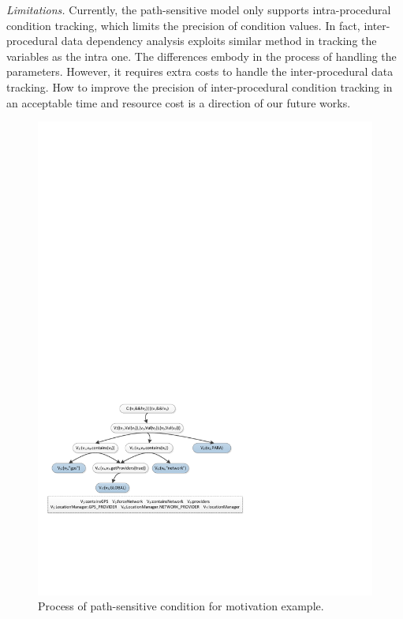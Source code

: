 \textit{Limitations.}
Currently, the path-sensitive model only supports intra-procedural condition tracking, which limits the precision of condition values. In fact, inter-procedural data dependency analysis exploits similar method in tracking the variables as the intra one. The differences embody in the process of handling the parameters. However, it requires extra costs to handle the inter-procedural data tracking. How to improve the precision of inter-procedural condition tracking in an acceptable time and resource cost is a direction of our future works.


\begin{figure}[!t]  
  \centering  
  \includegraphics[width=1\linewidth]{pic/motivationCondition.pdf}  
  \caption{Process of path-sensitive condition for motivation example.}  
  \label{fig:motConds}  
\end{figure}

